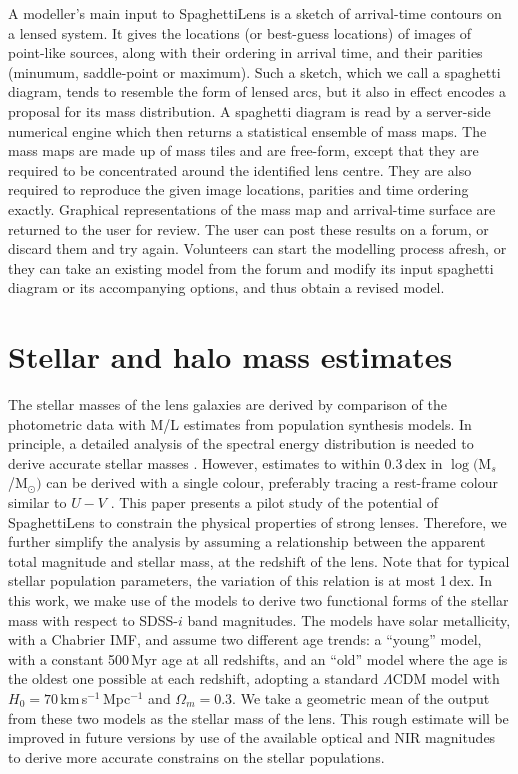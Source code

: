\documentclass[fleqn,usenatbib]{mnras}
\begin{document}
A modeller's main input to SpaghettiLens is a sketch of arrival-time
contours on a lensed system.  It gives the locations (or best-guess
locations) of images of point-like sources, along with their ordering
in arrival time, and their parities (minumum, saddle-point or
maximum).  Such a sketch, which we call a spaghetti diagram, tends to
resemble the form of lensed arcs, but it also in effect 
encodes a proposal for its mass distribution.  A spaghetti diagram is
read by a server-side numerical engine \citep[GLASS, developed
  by][]{2014MNRAS.445.2181C} which then returns a statistical ensemble
of mass maps.  The mass maps are made up of mass tiles and are
free-form, except that they are required to be concentrated around the
identified lens centre.  They are also required to reproduce the given
image locations, parities and time ordering exactly.  Graphical
representations of the mass map and arrival-time surface are returned
to the user for review.  The user can post these results on a forum,
or discard them and try again.  Volunteers can start the modelling
process afresh, or they can take an existing model from the forum and
modify its input spaghetti diagram or its accompanying options, and
thus obtain a revised model.


\section{Stellar and halo mass estimates}\label{sec:stellar-mass}

The stellar masses of the lens galaxies are derived by comparison of
the photometric data with M/L estimates from population synthesis
models.  In principle, a detailed analysis of the spectral energy
distribution is needed to derive accurate stellar masses
\citep[e.g.][]{2009ApJS..185..253G,2011MNRAS.418.1587T}.
However, estimates to within 0.3\,dex in $\log($M$_s$/M$_\odot)$ can be
derived with a single colour, preferably tracing a rest-frame colour
similar to $U-V$ \citep[see fig.~1 of][]{2008MNRAS.383..857F}. This
paper presents a pilot study of the potential of SpaghettiLens to
constrain the physical properties of strong lenses. Therefore, we
further simplify the analysis by assuming a relationship between the
apparent total magnitude and stellar mass, at the redshift of the
lens. Note that for typical stellar population parameters, the
variation of this relation is at most 1\,dex. In this work, we make
use of the \citet{2003MNRAS.344.1000B} models to derive two functional
forms of the stellar mass with respect to SDSS-$i$ band
magnitudes. The models have solar metallicity, with a Chabrier
IMF, and assume two different age trends: a ``young'' model, with a
constant 500\,Myr age at all redshifts, and an ``old'' model where the
age is the oldest one possible at each redshift, adopting a
standard $\Lambda$CDM model with $H_0=70$\,km\,s$^{-1}$\,Mpc$^{-1}$
and $\Omega_m=0.3$. We take a geometric mean of the output from these
two models as the stellar mass of the lens. This rough estimate will
be improved in future versions by use of the available optical and NIR
magnitudes to derive more accurate constrains on the stellar
populations.
\end{document}
